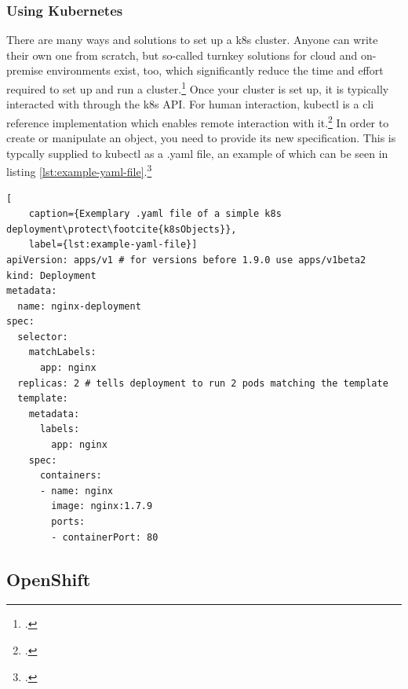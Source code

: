 
\subsubsection{Using Kubernetes}
There are many ways and solutions to set up a \gls{k8s} cluster. Anyone can write their own one from scratch, but so-called turnkey solutions for cloud and on-premise environments exist, too, which significantly reduce the time and effort required to set up and run a cluster.\footcite{turnkey}
Once your cluster is set up, it is typically interacted with through the \gls{k8s} API. For human interaction, kubectl is a \gls{cli} reference implementation which enables remote interaction with it.\footcite{k8sApi}
In order to create or manipulate an object, you need to provide its new specification. This is typcally supplied to kubectl as a .yaml file, an example of which can be seen in listing \ref{lst:example-yaml-file}.\footcite{k8sObjects}

\begin{lstlisting}[
	caption={Exemplary .yaml file of a simple k8s deployment\protect\footcite{k8sObjects}},
	label={lst:example-yaml-file}]
apiVersion: apps/v1 # for versions before 1.9.0 use apps/v1beta2
kind: Deployment
metadata:
  name: nginx-deployment
spec:
  selector:
    matchLabels:
      app: nginx
  replicas: 2 # tells deployment to run 2 pods matching the template
  template:
    metadata:
      labels:
        app: nginx
    spec:
      containers:
      - name: nginx
        image: nginx:1.7.9
        ports:
        - containerPort: 80
\end{lstlisting}


\subsection{OpenShift} \label{openshiftExplanation}

